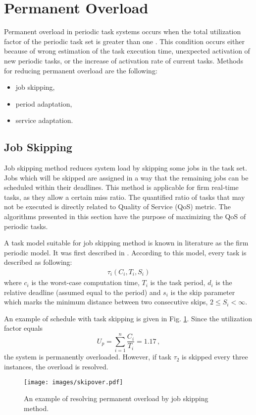 \section{Permanent Overload}

Permanent overload in periodic task systems occurs when the total utilization factor of the periodic task set is greater than one \cite{buttazzo2011hard}. 
This condition occurs either because of wrong estimation of the task execution time, unexpected activation of new periodic tasks, or the increase of activation rate of current tasks.
Methods for reducing permanent overload are the following:
\begin{itemize}
	\item{job skipping,}
	\item{period adaptation,}
	\item{service adaptation.}
\end{itemize}

\subsection{Job Skipping}
\label{skip_algs}
Job skipping method reduces system load by skipping some jobs in the task set. Jobs which will be skipped are assigned in a way that the remaining jobs can be scheduled within their deadlines.
This method is applicable for firm real-time tasks, as they allow a certain miss ratio. 
The quantified ratio of tasks that may not be executed is directly related to Quality of Service 
(QoS) metric. 
The algorithms presented in this section have the purpose of maximizing the QoS of periodic tasks.

A task model suitable for job skipping method is known in literature as the firm periodic model.
It was first described in \cite{koren1995skip}.
According to this model, every task is described as following:
\begin{align*}
\tau_i(C_i, T_i, S_i)
\end{align*}
where $c_i$ is the worst-case computation time, $T_i$ is the task period, $d_i$ is the relative deadline (assumed equal to the period) and $s_i$ is the skip parameter which marks the minimum distance between two consecutive skips, \(2 \leq S_i < \infty\).

An example of schedule with task skipping is given in Fig. \ref{skipover}. 
Since the utilization factor equals 
\begin{equation*}
U_p = \sum_{i=1}^{n} \frac{C_i}{T_i} = 1.17 \, ,
\end{equation*}
the system is permanently overloaded. 
However, if task \(\tau_2\) is skipped every three instances, the overload is resolved.
\\
\begin{figure}[ht]
    \centering
    \texttt{[image: images/skipover.pdf]}
    \caption{An example of resolving permanent overload by job skipping method.}
    \label{skipover}
\end{figure}


